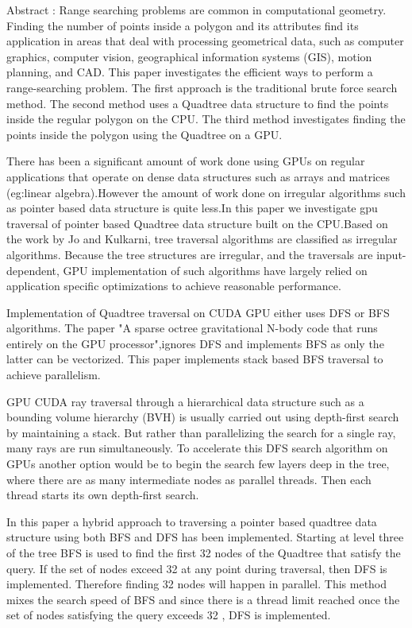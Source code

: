 
Abstract : 
Range searching problems are common in computational geometry. Finding the number of points inside a polygon and its attributes find its application in areas that deal with processing geometrical data, such as computer graphics, computer vision, geographical information systems (GIS), motion planning, and CAD. This paper investigates the efficient ways to perform a range-searching problem.
The first approach is the traditional brute force search method. The second method uses a Quadtree data structure to find the points inside the regular polygon on the CPU. The third method investigates finding the points inside the polygon using the Quadtree on a GPU.

There has been a significant amount of work done using GPUs on regular applications that operate on dense data structures such as arrays and matrices (eg:linear algebra).However the amount of work done on irregular algorithms such as pointer based data structure is quite less.In this paper we investigate gpu traversal of pointer based Quadtree data structure built on the CPU.Based on the work by Jo and Kulkarni, tree traversal algorithms are classified as irregular algorithms.
Because the tree structures are irregular, and the  traversals are input-dependent, GPU implementation of such algorithms have  largely relied on  application specific optimizations to achieve reasonable performance.

Implementation of Quadtree traversal on CUDA GPU either uses DFS or BFS algorithms. 
The paper "A sparse octree gravitational N-body code that runs entirely on the GPU processor",ignores DFS and implements  BFS as only the latter can be vectorized. This paper implements stack based BFS traversal to achieve parallelism.

GPU CUDA ray traversal through a hierarchical data structure such as a bounding volume hierarchy (BVH) is usually carried out using depth-first search  by maintaining a stack.
But rather than parallelizing the search for a single ray, many rays are run simultaneously.
To accelerate this DFS search algorithm on GPUs another option would be to begin the search few layers deep in the tree, where there are as many intermediate nodes as parallel threads. Then each thread starts its own depth-first search.

In this paper a hybrid approach to traversing a pointer based quadtree data structure using both BFS and DFS has been implemented.
Starting at level three of the tree BFS is used to find the first 32 nodes of the Quadtree that satisfy the query. If the set of nodes exceed 32 at any point during traversal, then DFS is implemented.
Therefore finding 32 nodes will happen in parallel. 
This method  mixes the search speed of BFS and since there is a thread limit reached once the set of nodes satisfying the query exceeds 32 , DFS is implemented.



